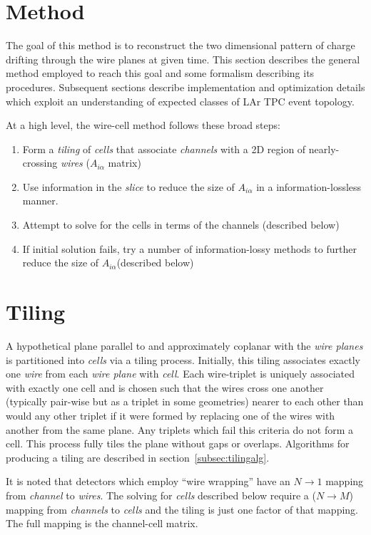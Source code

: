 \documentclass[letter]{article}
\def\mAchc{A_{i\alpha}}
\def\Achc{$\mAchc$\xspace}
\begin{document}
\section{Method}

The goal of this method is to reconstruct the two dimensional pattern
of charge drifting through the wire planes at given time.
This section describes the general method employed to reach
this goal and some formalism describing its procedures.
Subsequent sections describe implementation and optimization details
which exploit an understanding of expected classes of LAr TPC event topology.

At a high level, the wire-cell method follows these broad steps:

\begin{enumerate}
\item Form a \textit{tiling} of \textit{cells} that associate \textit{channels} with a 2D
  region of nearly-crossing \textit{wires} (\Achc matrix)
\item Use information in the \textit{slice} to reduce the size of
  \Achc in a information-lossless manner.
\item Attempt to solve for the cells in terms of the channels (described below)
\item If initial solution fails, try a number of information-lossy
  methods to further reduce the size of \Achc (described below)
\end{enumerate}

\section{Tiling}

A hypothetical plane parallel to and approximately coplanar with the
\textit{wire planes} is partitioned into \textit{cells} via a tiling
process.
Initially, this tiling associates exactly one \textit{wire} from each
\textit{wire plane} with \textit{cell}.
Each wire-triplet is uniquely associated with exactly one cell and is
chosen such that the wires cross one another (typically pair-wise but
as a triplet in some geometries) nearer to each other than would any
other triplet if it were formed by replacing one of the wires with
another from the same plane.
Any triplets which fail this criteria do not form a cell.
This process fully tiles the plane without gaps or overlaps.
Algorithms for producing a tiling are described in section~\ref{subsec:tilingalg}.

It is noted that detectors which employ ``wire wrapping'' have an $N
\to 1$ mapping from \textit{channel} to \textit{wires}.
The solving for \textit{cells} described below require a ($N \to M$)
mapping from \textit{channels} to \textit{cells} and the tiling is
just one factor of that mapping.
The full mapping is the channel-cell matrix.
\end{document}
